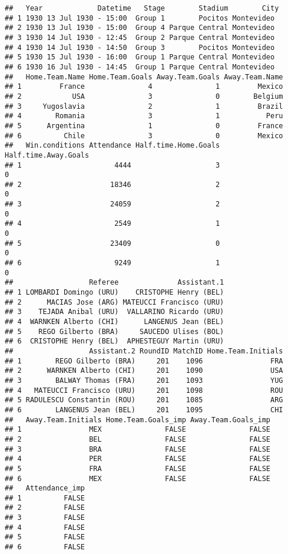 \documentclass[]{article}
\begin{document}
\begin{verbatim}
##   Year             Datetime   Stage        Stadium        City
## 1 1930 13 Jul 1930 - 15:00  Group 1        Pocitos Montevideo 
## 2 1930 13 Jul 1930 - 15:00  Group 4 Parque Central Montevideo 
## 3 1930 14 Jul 1930 - 12:45  Group 2 Parque Central Montevideo 
## 4 1930 14 Jul 1930 - 14:50  Group 3        Pocitos Montevideo 
## 5 1930 15 Jul 1930 - 16:00  Group 1 Parque Central Montevideo 
## 6 1930 16 Jul 1930 - 14:45  Group 1 Parque Central Montevideo 
##   Home.Team.Name Home.Team.Goals Away.Team.Goals Away.Team.Name
## 1         France               4               1         Mexico
## 2            USA               3               0        Belgium
## 3     Yugoslavia               2               1         Brazil
## 4        Romania               3               1           Peru
## 5      Argentina               1               0         France
## 6          Chile               3               0         Mexico
##   Win.conditions Attendance Half.time.Home.Goals Half.time.Away.Goals
## 1                      4444                    3                    0
## 2                     18346                    2                    0
## 3                     24059                    2                    0
## 4                      2549                    1                    0
## 5                     23409                    0                    0
## 6                      9249                    1                    0
##                  Referee              Assistant.1
## 1 LOMBARDI Domingo (URU)    CRISTOPHE Henry (BEL)
## 2      MACIAS Jose (ARG) MATEUCCI Francisco (URU)
## 3    TEJADA Anibal (URU)  VALLARINO Ricardo (URU)
## 4  WARNKEN Alberto (CHI)      LANGENUS Jean (BEL)
## 5    REGO Gilberto (BRA)     SAUCEDO Ulises (BOL)
## 6  CRISTOPHE Henry (BEL)  APHESTEGUY Martin (URU)
##                  Assistant.2 RoundID MatchID Home.Team.Initials
## 1        REGO Gilberto (BRA)     201    1096                FRA
## 2      WARNKEN Alberto (CHI)     201    1090                USA
## 3        BALWAY Thomas (FRA)     201    1093                YUG
## 4   MATEUCCI Francisco (URU)     201    1098                ROU
## 5 RADULESCU Constantin (ROU)     201    1085                ARG
## 6        LANGENUS Jean (BEL)     201    1095                CHI
##   Away.Team.Initials Home.Team.Goals_imp Away.Team.Goals_imp
## 1                MEX               FALSE               FALSE
## 2                BEL               FALSE               FALSE
## 3                BRA               FALSE               FALSE
## 4                PER               FALSE               FALSE
## 5                FRA               FALSE               FALSE
## 6                MEX               FALSE               FALSE
##   Attendance_imp
## 1          FALSE
## 2          FALSE
## 3          FALSE
## 4          FALSE
## 5          FALSE
## 6          FALSE
\end{verbatim}
\end{document}
